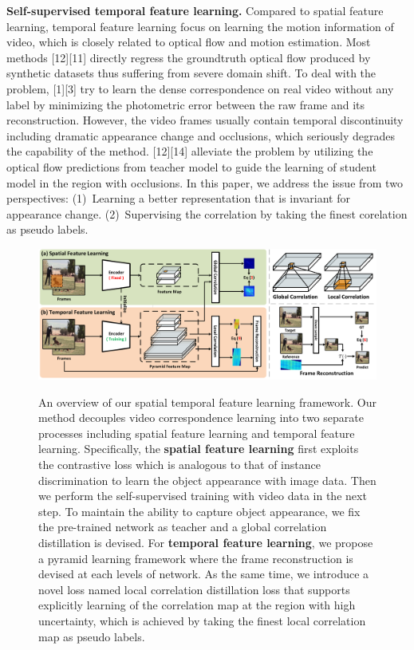 \documentclass{article}
\begin{document}
\textbf{Self-supervised temporal feature learning. } 
Compared to spatial feature learning, temporal feature learning focus on learning the motion information of video, which is closely related to optical flow and motion estimation. Most methods [12][11] directly regress the groundtruth optical flow produced by synthetic datasets thus suffering from severe domain shift. To deal with the problem, [1][3] try to learn the dense correspondence on real video without any label by minimizing the photometric error between the raw frame and its reconstruction. However, the video frames usually contain temporal discontinuity including dramatic appearance change and occlusions, which seriously degrades the capability of the method. [12][14] alleviate the problem by utilizing the optical flow predictions from teacher model to guide the learning of student model in the region with occlusions. In this paper, we address the issue from two perspectives: (1)~Learning a better representation that is invariant for appearance change. (2)~Supervising the correlation by taking the finest corelation as pseudo labels.


\begin{figure}[!tb]
  \centering
  {\includegraphics[width=1.0\textwidth]{figure/framework/framework.pdf}}
  \caption{\small An overview of our spatial temporal feature learning framework. Our method  decouples video correspondence learning into two separate processes including spatial feature learning and temporal feature learning. Specifically, the \textbf{spatial feature learning} first exploits the contrastive loss which is analogous to that of instance discrimination to learn the object appearance with image data. Then we perform the self-supervised training with video data in the next step. To maintain the ability to capture object appearance, we fix the pre-trained network as teacher and a global correlation distillation is devised.  For \textbf{temporal feature learning}, we propose a pyramid learning framework where the frame reconstruction is devised at each levels of network. As the same time, we introduce a novel loss named local correlation distillation loss that supports explicitly learning of the correlation map at the region with high uncertainty, which is achieved by taking the finest local correlation map as pseudo labels.}
  \label{fig:framework}
  \vspace{-7mm}
\end{figure}
\end{document}

